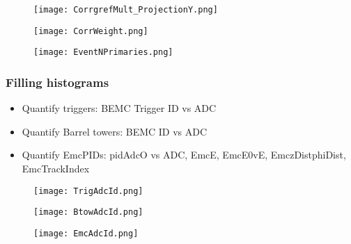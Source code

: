 \documentclass{beamer}
\begin{document}
\begin{frame}
 	\begin{figure}[h!]
	\centering
	\texttt{[image: CorrgrefMult\_ProjectionY.png]}
	\end{figure}
\end{frame}

\begin{frame}
	\begin{figure}[h!]
		\centering
		\texttt{[image: CorrWeight.png]}
	\end{figure}
\end{frame}

\begin{frame}
	\begin{figure}[h!]
		\centering
		\texttt{[image: EventNPrimaries.png]}
	\end{figure}
\end{frame}





\begin{frame}
  \frametitle{Filling histograms}
  \begin{itemize}
    \item Quantify triggers: BEMC Trigger ID vs ADC
    \item Quantify Barrel towers: BEMC ID vs ADC
    \item Quantify EmcPIDs: pidAdcO vs ADC, EmcE, EmcE0vE, EmczDistphiDist, EmcTrackIndex
  \end{itemize}
\end{frame}

\begin{frame}
  \begin{figure}[h!]
  \centering
  \texttt{[image: TrigAdcId.png]}
  \end{figure}
\end{frame}

\begin{frame}
  \begin{figure}[h!]
  \centering
  \texttt{[image: BtowAdcId.png]}
  \end{figure}
\end{frame}

\begin{frame}
  \begin{figure}[h!]
  \centering
  \texttt{[image: EmcAdcId.png]}
  \end{figure}
\end{frame}
\end{document}
